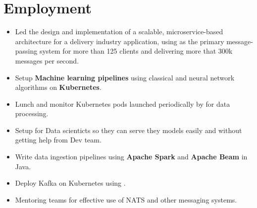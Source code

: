 \section{Employment}

\vspace{0.5cm}
\begin{itemize}
  \item Led the design and implementation of a scalable, microservice-based architecture for a delivery industry application,
        using  as the primary message-passing system for more than 125 clients and delivering
        more that 300k messages per second.
  \item Setup \textbf{Machine learning pipelines} using classical and neural network algorithms on \textbf{Kubernetes}.
  \item Lunch and monitor Kubernetes pods launched periodically by  for data processing.
  \item Setup  for Data scienticts so they can serve they models easily and without getting help from Dev team.
  \item Write data ingestion pipelines using \textbf{Apache Spark} and \textbf{Apache Beam} in Java.
  \item Deploy Kafka on Kubernetes using .
  \item Mentoring teams for effective use of NATS and other messaging systems.
\end{itemize}

\vspace{1cm}

